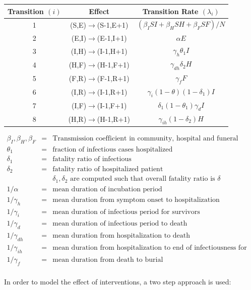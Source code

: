 \documentclass[10pt, journal,onecolumn]{IEEEtran}
\begin{document}
\begin{center}
\begin{tabular}{|c|c|c|}
\hline 
Transition $(i)$ & Effect & Transition Rate $(\lambda_i)$ \tabularnewline
\hline 
\hline 
1 & (S,E)$\to$(S-1,E+1) & $(\beta_{I}SI+\beta_{H}SH+\beta_{F}SF)/N$\tabularnewline
\hline 
2 & (E,I)$\to$(E-1,I+1) & $\alpha E$\tabularnewline
\hline 
3 & (I,H)$\to$(I-1,H+1) & $\gamma_{h}\theta_{1}I$\tabularnewline
\hline 
4 & (H,F)$\to$(H-1,F+1) & $\gamma_{dh}\delta_{2}H$\tabularnewline
\hline 
5 & (F,R)$\to$(F-1,R+1) & $\gamma_{f}F$\tabularnewline
\hline 
6 & (I,R)$\to$(I-1,R+1) & $\gamma_{i}(1-\theta)(1-\delta_{1})I$\tabularnewline
\hline 
7 & (I,F)$\to$(I-1,F+1) & $\delta_{1}(1-\theta_{1})\gamma_{d}I$\tabularnewline
\hline 
8 & (H,R)$\to$(H-1,R+1) & $\gamma_{ih}(1-\delta_{2})H$\tabularnewline
\hline 
\end{tabular}
\end{center}

\begin{eqnarray*}
\beta_I, \beta_H, \beta_F &=& \text{Transmission coefficient in community, hospital and funeral respectively}\\
\theta_1 &=& \text{fraction of infectious cases hospitalized}\\
\delta_1 &=& \text{fatality ratio of infectious}\\
\delta_2 &=& \text{fatality ratio of hospitalized patient}\\
&& \delta_1, \delta_2 \text{ are computed such that overall fatality ratio is $\delta$}\\
1/\alpha &=& \text{mean duration of incubation period}\\
1/\gamma_h &=& \text{mean duration from symptom onset to hospitalization}\\
1/\gamma_{i} &=& \text{mean duration of infectious period for survivors}\\
1/\gamma_{d} &=& \text{mean duration of infectious period to death}\\
1/\gamma_{dh} &=& \text{mean duration from hospitalization to death}\\
1/\gamma_{ih} &=& \text{mean duration from hospitalization to end of infectiousness for survivors}\\
1/\gamma_{f} &=& \text{mean duration from death to burial}\\
\end{eqnarray*}

In order to model the effect of interventions, a two step approach is used:
\end{document}
